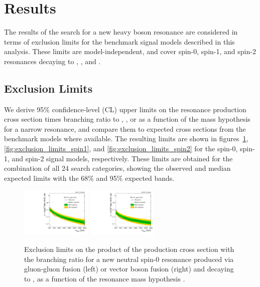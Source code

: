 
\section{Results}
\label{sec:results}

The results of the search for a new heavy boson resonance are considered in terms of exclusion limits for the benchmark signal models described in this analysis.
These limits are model-independent, and cover spin-0, spin-1, and spin-2 resonances decaying to \WW, \WZ, and \WH.

\subsection{Exclusion Limits}

We derive 95\% confidence-level (CL) upper limits on the resonance production cross section times branching ratio to \WW, \WZ, or \WH as a function of the mass hypothesis \MX for a narrow resonance, and compare them to expected cross sections from the benchmark models where available.
The resulting limits are shown in figures~\ref{fig:exclusion_limits_spin0}, \ref{fig:exclusion_limits_spin1}, and \ref{fig:exclusion_limits_spin2} for the spin-0, spin-1, and spin-2 signal models, respectively.
These limits are obtained for the combination of all 24 search categories, showing the observed and median expected limits with the 68\% and 95\% expected bands.

\begin{figure}[htbp]
  \centering
  \includegraphics[width=0.3\textwidth]{fig/results/limits_RadToWW_o_74.pdf}
  \includegraphics[width=0.3\textwidth]{fig/results/limits_VBFRadToWW_o_74.pdf}
  \caption{
    Exclusion limits on the product of the production cross section with the branching ratio for a new neutral spin-0 resonance produced via gluon-gluon fusion (left) or vector boson fusion (right) and decaying to \WW, as a function of the resonance mass hypothesis \MX.
  }
  \label{fig:exclusion_limits_spin0}
\end{figure}

